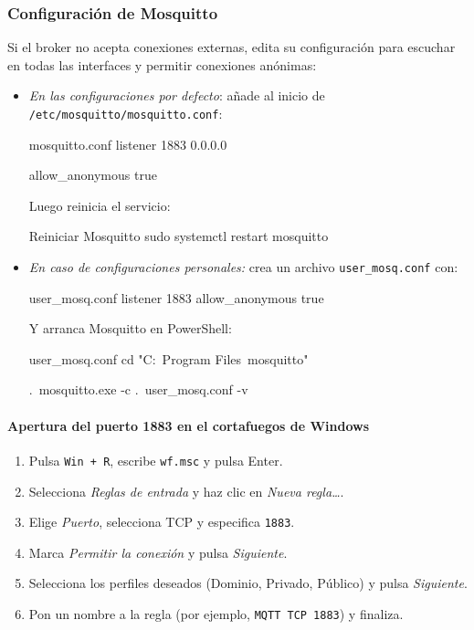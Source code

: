 \documentclass[12pt, a4paper]{article}
\begin{document}
\begin{umaappendices}
		\subsubsection{Configuración de Mosquitto}
		Si el broker no acepta conexiones externas, edita su configuración para escuchar en todas las interfaces y permitir conexiones anónimas:
		
		\begin{itemize}
			\item  \textit{En las configuraciones por defecto}: añade al inicio de \texttt{/etc/mosquitto/mosquitto.conf}:
			\begin{Terminal}{mosquitto.conf}
				listener 1883 0.0.0.0 
				 
				allow\_anonymous true
			\end{Terminal}
			Luego reinicia el servicio:
			\begin{Terminal}{Reiniciar Mosquitto}
				sudo systemctl restart mosquitto
			\end{Terminal}
			
			\item \textit{En caso de configuraciones personales:} crea un archivo \texttt{user\_mosq.conf} con:
			\begin{Terminal}{user\_mosq.conf}
				listener 1883  
				allow\_anonymous true
			\end{Terminal}
			Y arranca Mosquitto en PowerShell:
			\begin{Terminal}{user\_mosq.conf}
				cd "C:\ Program Files\ mosquitto"  
				
				.\ mosquitto.exe -c .\ user\_mosq.conf -v
			\end{Terminal}
		\end{itemize}
		
		\paragraph{Apertura del puerto 1883 en el cortafuegos de Windows}
			\begin{enumerate}
				\item Pulsa \texttt{Win + R}, escribe \texttt{wf.msc} y pulsa Enter.
				\item Selecciona \textit{Reglas de entrada} y haz clic en \textit{Nueva regla…}.
				\item Elige \textit{Puerto}, selecciona TCP y especifica \texttt{1883}.
				\item Marca \textit{Permitir la conexión} y pulsa \textit{Siguiente}.
				\item Selecciona los perfiles deseados (Dominio, Privado, Público) y pulsa \textit{Siguiente}.
				\item Pon un nombre a la regla (por ejemplo, \texttt{MQTT TCP 1883}) y finaliza.
			\end{enumerate}


\end{umaappendices}
\end{document}
